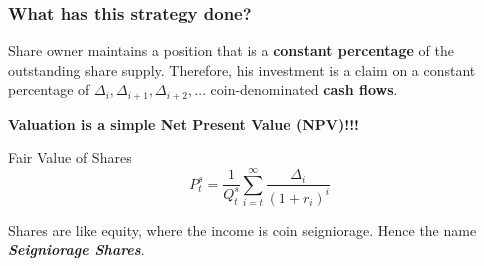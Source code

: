 \documentclass{beamer}
\begin{document}
\begin{frame}
  \frametitle{What has this strategy done?}

  Share owner maintains a position that is a \textbf{constant
    percentage} of the outstanding share supply. Therefore, his
  investment is a claim on a constant percentage of $\Delta_{i},
  \Delta_{i+1}, \Delta_{i+2}, \dots$ coin-denominated \textbf{cash
    flows}.

  \begin{center}
    \textbf{Valuation is a simple Net Present Value (NPV)!!!}
  \end{center}

  \begin{block}{Fair Value of Shares}
    \begin{equation*}
      P^{s}_{t} = \frac{1}{Q^{s}_{t}}\sum\limits_{i=t}^{\infty}\frac{\Delta_{i}}{(1+r_{i})^{i}}
    \end{equation*}
  \end{block}
  Shares are like equity, where the income is coin seigniorage. Hence
  the name \emph{\textbf{Seigniorage Shares}}.
\end{frame}
\end{document}
